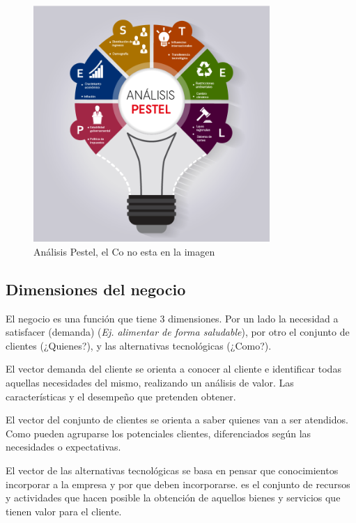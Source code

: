 \documentclass[titlepage,a4paper]{article}
\begin{document}
\begin{figure}[!htb]
    \centering
    \includegraphics[width=0.8\textwidth]{imagenes/PestelAnalisis.png}
    \caption{Análisis Pestel, el Co no esta en la imagen}
\end{figure}

\subsection{Dimensiones del negocio}
El negocio es una función que tiene 3 dimensiones. Por un lado la necesidad a satisfacer (demanda) (\textit{Ej. alimentar de forma saludable}), por otro el conjunto de clientes (¿Quienes?), y las alternativas tecnológicas (¿Como?).

El vector demanda del cliente se orienta a conocer al cliente e identificar todas aquellas necesidades del mismo, realizando un análisis de valor. Las características y el desempeño que pretenden obtener.

El vector del conjunto de clientes se orienta a saber quienes van a ser atendidos. Como pueden agruparse los potenciales clientes, diferenciados según las necesidades o expectativas.

El vector de las alternativas tecnológicas se basa en pensar que conocimientos incorporar a la empresa y por que deben incorporarse. es el conjunto de recursos y actividades que hacen posible la obtención de aquellos bienes y servicios que tienen valor para el cliente.
\end{document}

